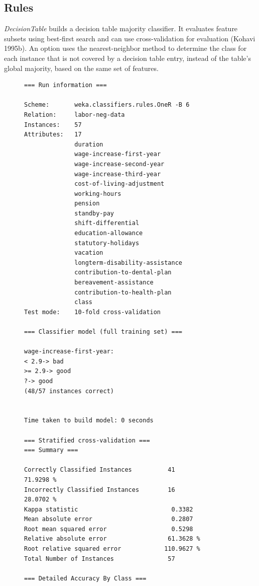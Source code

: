 \subsection{Rules}

\textit{DecisionTable} builds a decision table majority classifier. It
evaluates feature subsets using best-first search and can use
cross-validation for evaluation (Kohavi 1995b). An option uses the
nearest-neighbor method to determine the class for each instance that
is not covered by a decision table entry, instead of the table’s
global majority, based on the same set of features.

\begin{figure}[!p]
\begin{mdframed}[innermargin=-1.5cm]
\begin{Verbatim}[fontsize=\scriptsize]
=== Run information ===

Scheme:       weka.classifiers.rules.OneR -B 6
Relation:     labor-neg-data
Instances:    57
Attributes:   17
              duration
              wage-increase-first-year
              wage-increase-second-year
              wage-increase-third-year
              cost-of-living-adjustment
              working-hours
              pension
              standby-pay
              shift-differential
              education-allowance
              statutory-holidays
              vacation
              longterm-disability-assistance
              contribution-to-dental-plan
              bereavement-assistance
              contribution-to-health-plan
              class
Test mode:    10-fold cross-validation

=== Classifier model (full training set) ===

wage-increase-first-year:
< 2.9-> bad
>= 2.9-> good
?-> good
(48/57 instances correct)


Time taken to build model: 0 seconds

=== Stratified cross-validation ===
=== Summary ===

Correctly Classified Instances          41               71.9298 %
Incorrectly Classified Instances        16               28.0702 %
Kappa statistic                          0.3382
Mean absolute error                      0.2807
Root mean squared error                  0.5298
Relative absolute error                 61.3628 %
Root relative squared error            110.9627 %
Total Number of Instances               57     

=== Detailed Accuracy By Class ===


\end{Verbatim}
\end{mdframed}
\end{figure}
